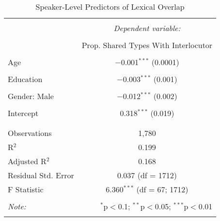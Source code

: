 
\begin{table}[!htbp] \centering 
  \caption{Speaker-Level Predictors of Lexical Overlap} 
  \label{monadRegression} 
\begin{tabular}{@{\extracolsep{5pt}}lc} 
\\[-1.8ex]\hline 
\hline \\[-1.8ex] 
 & \multicolumn{1}{c}{\textit{Dependent variable:}} \\ 
\cline{2-2} 
\\[-1.8ex] & Prop. Shared Types With Interlocutor \\ 
\hline \\[-1.8ex] 
 Age & $-$0.001$^{***}$ (0.0001) \\ 
  & \\ 
 Education & $-$0.003$^{***}$ (0.001) \\ 
  & \\ 
 Gender: Male & $-$0.012$^{***}$ (0.002) \\ 
  & \\ 
 Intercept & 0.318$^{***}$ (0.019) \\ 
  & \\ 
\hline \\[-1.8ex] 
Observations & 1,780 \\ 
R$^{2}$ & 0.199 \\ 
Adjusted R$^{2}$ & 0.168 \\ 
Residual Std. Error & 0.037 (df = 1712) \\ 
F Statistic & 6.360$^{***}$ (df = 67; 1712) \\ 
\hline 
\hline \\[-1.8ex] 
\textit{Note:}  & \multicolumn{1}{r}{$^{*}$p$<$0.1; $^{**}$p$<$0.05; $^{***}$p$<$0.01} \\ 
\normalsize 
\end{tabular} 
\end{table} 
